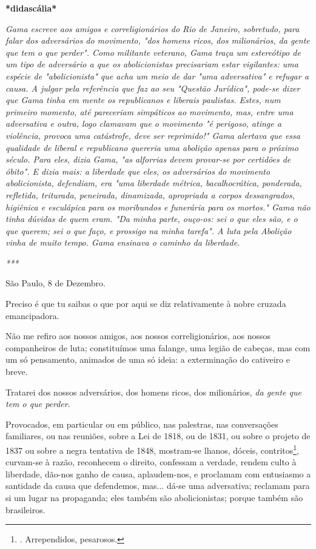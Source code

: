\textbf{*didascália*}

\emph{Gama escreve aos amigos e correligionários do Rio de Janeiro,
sobretudo, para falar dos adversários do movimento, "dos homens ricos,
dos milionários, da gente que tem o que perder". Como militante
veterano, Gama traça um estereótipo de um tipo de adversário a que os
abolicionistas precisariam estar vigilantes: uma espécie de
"abolicionista" que acha um meio de dar "uma adversativa" e refugar a
causa. A julgar pela referência que faz ao seu "Questão Jurídica",
pode-se dizer que Gama tinha em mente os republicanos e liberais
paulistas. Estes, num primeiro momento, até pareceriam simpáticos ao
movimento, mas, entre uma adversativa e outra, logo clamavam que o
movimento "é perigoso, atinge a violência, provoca uma catástrofe, deve
ser reprimido!" Gama alertava que essa qualidade de liberal e
republicano quereria uma abolição apenas para o próximo século. Para
eles, dizia Gama, "as alforrias devem provar-se por certidões de óbito".
E dizia mais: a liberdade que eles, os adversários do movimento
abolicionista, defendiam, era "uma liberdade métrica, bacalhocrática,
ponderada, refletida, triturada, peneirada, dinamizada, apropriada a
corpos dessangrados, higiênica e esculápica para os moribundos e
funerária para os mortos." Gama não tinha dúvidas de quem eram. "Da
minha parte, ouço-os: sei o que eles são, e o que querem; sei o que
faço, e prossigo na minha tarefa". A luta pela Abolição vinha de muito
tempo. Gama ensinava o caminho da liberdade. }

\emph{***}

São Paulo, 8 de Dezembro.

Preciso é que tu saibas o que por aqui se diz relativamente à nobre
cruzada emancipadora.

Não me refiro aos nossos amigos, aos nossos correligionários, aos nossos
companheiros de luta; constituímos uma falange, uma legião de cabeças,
mas com um só pensamento, animados de uma só ideia: a exterminação do
cativeiro e breve.

Tratarei dos nossos adversários, dos homens ricos, dos milionários,
\emph{da gente que tem o que perder}.

Provocados, em particular ou em público, nas palestras, nas conversações
familiares, ou nas reuniões, sobre a Lei de 1818, ou de 1831, ou sobre o
projeto de 1837 ou sobre a negra tentativa de 1848, mostram-se lhanos,
dóceis, contritos\footnote{. Arrependidos, pesarosos.}, curvam-se à
razão, reconhecem o direito, confessam a verdade, rendem culto à
liberdade, dão-nos ganho de causa, aplaudem-nos, e proclamam com
entusiasmo a santidade da causa que defendemos, mas... dá-se uma
adversativa; reclamam para si um lugar na propaganda; eles também são
abolicionistas; porque também são brasileiros.

